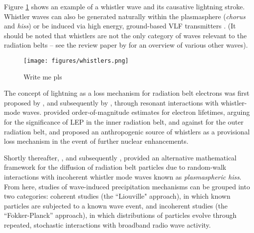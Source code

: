 Figure \ref{fig:whistlers} shows an example of a whistler wave and its causative lightning stroke. Whistler waves can also be generated naturally within the plasmasphere (\emph{chorus} and \emph{hiss}) or be induced via high energy, ground-based VLF transmitters \citep{Graf2013}. (It should be noted that whistlers are not the only category of waves relevant to the radiation belts -- see the review paper by \cite{Thorne2010a} for an overview of various other waves).

\begin{figure}[t]
\begin{center}
\texttt{[image: figures/whistlers.png]}

\caption[An example of a lightning-generated whistler wave]{Write me pls}
\label{fig:whistlers}
\end{center}
\end{figure}

The concept of lightning as a loss mechanism for radiation belt electrons was first proposed by \cite{Dungey1963}, and subsequently by \cite{Cornwall1964}, through resonant interactions with whistler-mode waves. \citeauthor{Dungey1963} provided order-of-magnitude estimates for electron lifetimes, arguing for the significance of LEP in the inner radiation belt, and against for the outer radiation belt, and proposed an anthropogenic source of whistlers as a provisional loss mechanism in the event of further nuclear enhancements. 

Shortly thereafter, \cite{Kennel1966b}, and subsequently \cite{Lyons1973}, provided an alternative mathematical framework for the diffusion of radiation belt particles due to random-walk interactions with incoherent whistler mode waves known as \emph{plasmaspheric hiss}. From here, studies of wave-induced precipitation mechanisms can be grouped into two categories: coherent studies (the ``Liouville" approach), in which known particles are subjected to a known wave event, and incoherent studies (the ``Fokker-Planck'' approach), in which distributions of particles evolve through repeated, stochastic interactions with broadband radio wave activity.

